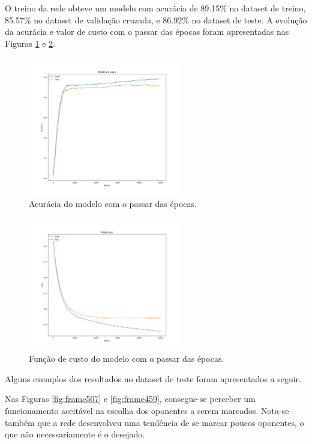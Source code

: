 \documentclass[a4paper,12pt]{article}
\begin{document}
O treino da rede obteve um modelo com acurácia de 89.15\% no dataset de treino, 85.57\% no dataset de validação cruzada, e 86.92\% no dataset de teste. A evolução da acurácia e valor de custo com o passar das épocas foram apresentadas nas Figuras \ref{fig:acc} e \ref{fig:loss}.

\begin{figure}[H]
	\centering
	\includegraphics[width=0.6\textwidth]{figures/model_accuracy.png}
   \caption{Acurácia do modelo com o passar das épocas.} \label{fig:acc}
\end{figure}

\begin{figure}[H]
	\centering
	\includegraphics[width=0.6\textwidth]{figures/model_loss.png}
   \caption{Função de custo do modelo com o passar das épocas.} \label{fig:loss}
\end{figure}

Alguns exemplos dos resultados no dataset de teste foram apresentados a seguir.

Nas Figuras \ref{fig:frame507} e \ref{fig:frame459}, consegue-se perceber um funcionamento aceitável na escolha dos oponentes a serem marcados. Nota-se também que a rede desenvolveu uma tendência de se marcar poucos oponentes, o que não necessariamente é o desejado.
\end{document}
